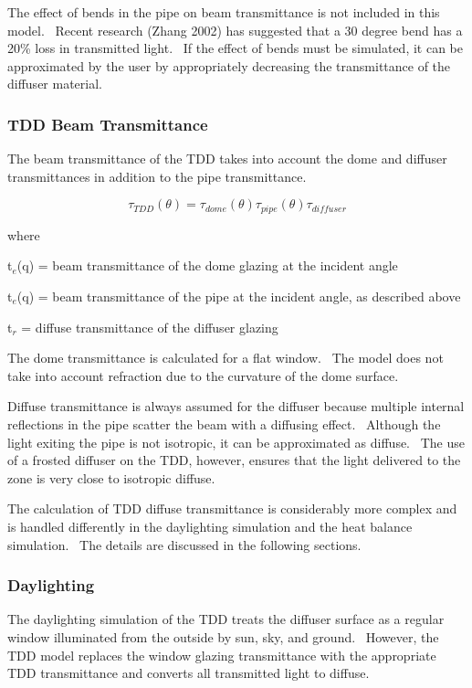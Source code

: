 The effect of bends in the pipe on beam transmittance is not included in this model.~ Recent research (Zhang 2002) has suggested that a 30 degree bend has a 20\% loss in transmitted light.~ If the effect of bends must be simulated, it can be approximated by the user by appropriately decreasing the transmittance of the diffuser material.

\subsubsection{TDD Beam Transmittance}\label{tdd-beam-transmittance}

The beam transmittance of the TDD takes into account the dome and diffuser transmittances in addition to the pipe transmittance.

\begin{equation}
{\tau_{TDD}}(\theta ) = {\tau_{dome}}(\theta ){\tau_{pipe}}(\theta ){\tau_{diffuser}}
\end{equation}

where

t\(_{e}\)(q) = beam transmittance of the dome glazing at the incident angle

t\(_{e}\)(q) = beam transmittance of the pipe at the incident angle, as described above

t\(_{r}\) = diffuse transmittance of the diffuser glazing

The dome transmittance is calculated for a flat window.~ The model does not take into account refraction due to the curvature of the dome surface.

Diffuse transmittance is always assumed for the diffuser because multiple internal reflections in the pipe scatter the beam with a diffusing effect.~ Although the light exiting the pipe is not isotropic, it can be approximated as diffuse.~ The use of a frosted diffuser on the TDD, however, ensures that the light delivered to the zone is very close to isotropic diffuse.

The calculation of TDD diffuse transmittance is considerably more complex and is handled differently in the daylighting simulation and the heat balance simulation.~ The details are discussed in the following sections.

\subsubsection{Daylighting}\label{daylighting}

The daylighting simulation of the TDD treats the diffuser surface as a regular window illuminated from the outside by sun, sky, and ground.~ However, the TDD model replaces the window glazing transmittance with the appropriate TDD transmittance and converts all transmitted light to diffuse.

